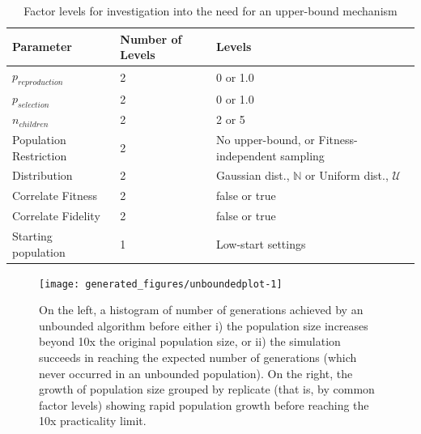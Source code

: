\begin{table} %
	\begin{center}
		\caption{Factor levels for investigation into the need for an upper-bound mechanism}
		\label{tbl:factors-levels-for-upper-bound-investigation}
		\begin{tabular}{@{}llp{6cm}@{}}
			\toprule
			Parameter              & Number of Levels & Levels                                                       \\
			\midrule
			$p_{reproduction}$     & 2                & 0 or 1.0                                                     \\
			$p_{selection}$        & 2                & 0 or 1.0                                                     \\
			$n_{children}$         & 2                & 2 or 5                                                       \\
			Population Restriction & 2                & No upper-bound, or Fitness-independent sampling              \\
			Distribution           & 2                & Gaussian dist., $\mathbb{N}$ or Uniform dist., $\mathcal{U}$ \\
			Correlate Fitness      & 2                & false or true                                                \\
			Correlate Fidelity     & 2                & false or true                                                \\
			Starting population    & 1                & Low-start settings                                           \\
			\bottomrule
		\end{tabular}
	\end{center}
\end{table}

\begin{knitrout}
\color{fgcolor}\begin{figure}[htp]
\texttt{[image: generated\_figures/unboundedplot-1]} \caption[On the left, a histogram of number of generations achieved by an unbounded algorithm before either i) the population size increases beyond 10x the original population size, or ii) the simulation succeeds in reaching the expected number of generations (which never occurred in an unbounded population)]{On the left, a histogram of number of generations achieved by an unbounded algorithm before either i) the population size increases beyond 10x the original population size, or ii) the simulation succeeds in reaching the expected number of generations (which never occurred in an unbounded population). On the right, the growth of population size grouped by replicate (that is, by common factor levels) showing rapid population growth before reaching the 10x practicality limit.}\label{fig:unboundedplot}
\end{figure}


\end{knitrout}

